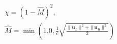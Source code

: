 \documentclass[10pt]{article}
\begin{document}
\begin{align*}& \chi = \left( 1 - \widehat{M} \right)^2, \\
& \widehat{M} =\min \left( 1.0, \frac{1}{\bar{c}} \sqrt{ \frac{ \| \boldsymbol{u}_{L} \| ^2 + \| \boldsymbol{u}_{R} \|^2 }{2}} \right)\end{align*}
\end{document}
